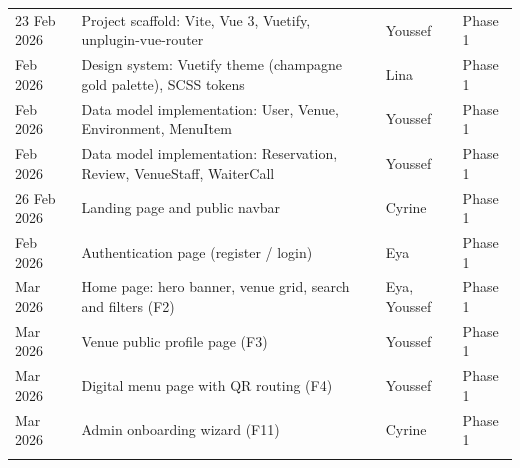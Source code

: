 \documentclass[12pt,a4paper,oneside]{report}
\begin{document}
\begin{longtable}{L{2.5cm} L{6cm} L{2.5cm} L{1.5cm}}
  23 Feb 2026 & Project scaffold: Vite, Vue 3, Vuetify, unplugin-vue-router & Youssef & Phase 1 \\
   Feb 2026 & Design system: Vuetify theme (champagne gold palette), SCSS tokens & Lina & Phase 1 \\
   Feb 2026 & Data model implementation: User, Venue, Environment, MenuItem & Youssef & Phase 1 \\
   Feb 2026 & Data model implementation: Reservation, Review, VenueStaff, WaiterCall & Youssef & Phase 1 \\
  \addlinespace

  26 Feb 2026 & Landing page and public navbar & Cyrine & Phase 1 \\
   Feb 2026 & Authentication page (register / login) & Eya & Phase 1 \\
   Mar 2026 & Home page: hero banner, venue grid, search and filters (F2) & Eya, Youssef & Phase 1 \\
   Mar 2026 & Venue public profile page (F3) & Youssef & Phase 1 \\
   Mar 2026 & Digital menu page with QR routing (F4) & Youssef & Phase 1 \\
   Mar 2026 & Admin onboarding wizard (F11) & Cyrine & Phase 1 \\
  \addlinespace


\end{longtable}
\end{document}

